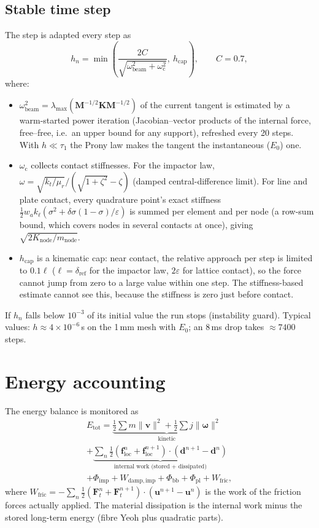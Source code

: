 \documentclass[11pt,a4paper]{article}
\newcommand{\vect}[1]{\bm{#1}}
\newcommand{\mat}[1]{\mathbf{#1}}
\begin{document}
\subsection{Stable time step}
The step is adapted every step as
\begin{equation}
h_n = \min\!\left(\frac{2C}{\sqrt{\omega_\mathrm{beam}^2 + \omega_\mathrm{c}^2}},\ h_\mathrm{cap}\right),\qquad C = 0.7,
\end{equation}
where:
\begin{itemize}
\item $\omega_\mathrm{beam}^2 = \lambda_{\max}(\mat M^{-1/2}\mat K\mat M^{-1/2})$ of the current tangent is
estimated by a warm-started power iteration (Jacobian--vector products of the internal force, free--free,
i.e.\ an upper bound for any support), refreshed every 20 steps. With $h\ll\tau_1$ the Prony law makes the
tangent the instantaneous ($E_0$) one.
\item $\omega_\mathrm{c}$ collects contact stiffnesses. For the impactor law,
$\omega = \sqrt{k_t/\mu_r}/(\sqrt{1+\zeta^2}-\zeta)$ (damped central-difference limit). For line and plate
contact, every quadrature point's exact stiffness
$\tfrac12 w_a k_\ell(\sigma^2 + \delta\sigma(1-\sigma)/\varepsilon)$ is summed per element and per node (a
row-sum bound, which covers nodes in several contacts at once), giving $\sqrt{2K_\mathrm{node}/m_\mathrm{node}}$.
\item $h_\mathrm{cap}$ is a kinematic cap: near contact, the relative approach per step is limited to
$0.1\ell$ ($\ell = \delta_\mathrm{ref}$ for the impactor law, $2\varepsilon$ for lattice contact), so the force
cannot jump from zero to a large value within one step. The stiffness-based estimate cannot see this, because
the stiffness is zero just before contact.
\end{itemize}
If $h_n$ falls below $10^{-3}$ of its initial value the run stops (instability guard). Typical values: $h\approx
4\times10^{-6}$\,s on the 1\,mm mesh with $E_0$; an 8\,ms drop takes $\approx 7400$ steps.

\section{Energy accounting}
\label{sec:energy}
The energy balance is monitored as
\begin{multline}
E_\mathrm{tot} = \underbrace{\tfrac12\sum m\lVert\vect v\rVert^2 + \tfrac12\sum j\lVert\vect\omega\rVert^2}_{\text{kinetic}}\\
+ \underbrace{\sum_n \tfrac12(\vect f_\mathrm{loc}^n + \vect f_\mathrm{loc}^{n+1})\cdot(\vect d^{n+1}-\vect d^n)}_{\text{internal work (stored + dissipated)}}\\
+ \Phi_\mathrm{imp} + W_\mathrm{damp,imp} + \Phi_\mathrm{bb} + \Phi_\mathrm{pl} + W_\mathrm{fric},
\end{multline}
where $W_\mathrm{fric} = -\sum_n \tfrac12(\vect F_t^n+\vect F_t^{n+1})\cdot(\vect u^{n+1}-\vect u^n)$ is the
work of the friction forces actually applied. The material dissipation is the internal work minus the stored
long-term energy (fibre Yeoh plus quadratic parts).
\end{document}
